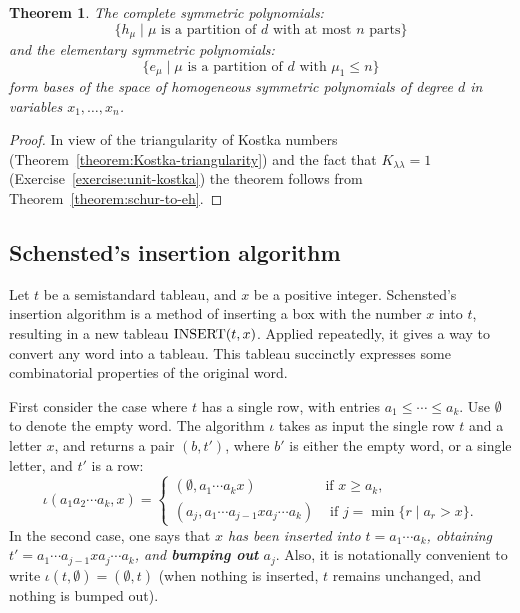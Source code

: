 \documentclass[11pt]{amsproc}
\newtheorem{theorem}{Theorem}[subsection]
\theoremstyle{definition}
\theoremstyle{example}
\newcommand{\rins}{\iota}
\newcommand{\ins}{\textup{INSERT}}
\begin{document}
\begin{theorem}
  The complete symmetric polynomials:
  \begin{displaymath}
    \{h_\mu \mid \text{$\mu$ is a partition of $d$ with at most $n$ parts}\}
  \end{displaymath}
  and the elementary symmetric polynomials:
  \begin{displaymath}
    \{e_\mu\mid \text{$\mu$ is a partition of $d$ with $\mu_1\leq n$}\}
  \end{displaymath}
  form bases of the space of homogeneous symmetric polynomials of degree $d$ in variables $x_1,\dotsc,x_n$.
\end{theorem}
\begin{proof}
  In view of the triangularity of Kostka numbers (Theorem~\ref{theorem:Kostka-triangularity}) and the fact that $K_{\lambda\lambda}=1$ (Exercise~\ref{exercise:unit-kostka}) the theorem follows from Theorem~\ref{theorem:schur-to-eh}.
\end{proof}
\subsection{Schensted's insertion algorithm}
\label{sec:schenst-insert-algor}
Let $t$ be a semistandard tableau, and $x$ be a positive integer.
Schensted's insertion algorithm is a method of inserting a box with the number $x$ into $t$, resulting in a new tableau $\ins(t, x)$.
Applied repeatedly, it gives a way to convert any word into a tableau.
This tableau succinctly expresses some combinatorial properties of the original word.

First consider the case where $t$ has a single row, with entries $a_1\leq \dotsb \leq a_k$.
Use $\emptyset$ to denote the empty word.
The algorithm $\rins$ takes as input the single row $t$ and a letter $x$, and returns a pair $(b, t')$, where $b'$ is either the empty word, or a single letter, and $t'$ is a row:
\begin{displaymath}
  \rins(a_1a_2\dotsb a_k, x) =
  \begin{cases}
    (\emptyset, a_1\dotsb a_k x) & \text{if $x\geq a_k$},\\
    (a_j, a_1\dotsb a_{j-1} x a_j \dotsb a_k) & \text{ if } j = \min\{r \mid a_r > x\}.
  \end{cases}
\end{displaymath}
In the second case, one says that \emph{$x$ has been inserted into $t=a_1\dotsb a_k$, obtaining $t'=a_1\dotsb a_{j-1} x a_j \dotsb a_k$, and \textbf{bumping out} $a_j$}.
Also, it is notationally convenient to write $\rins(t, \emptyset) = (\emptyset, t)$ (when nothing is inserted, $t$ remains unchanged, and nothing is bumped out).
\end{document}
